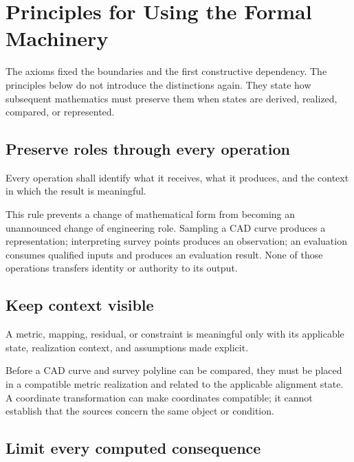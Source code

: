 
\chapter{Principles for Using the Formal Machinery}
\label{chap:architectural-principles}

The axioms fixed the boundaries and the first constructive dependency.
The principles below do not introduce the distinctions again. They state
how subsequent mathematics must preserve them when states are derived,
realized, compared, or represented.

\section{Preserve roles through every operation}

\begin{principle}
\label{princ:typed-dependency}
Every operation shall identify what it receives, what it produces, and
the context in which the result is meaningful.
\end{principle}

This rule prevents a change of mathematical form from becoming an
unannounced change of engineering role. Sampling a CAD curve produces a
representation; interpreting survey points produces an observation; an
evaluation consumes qualified inputs and produces an evaluation result.
None of those operations transfers identity or authority to its output.

\section{Keep context visible}

\begin{principle}
\label{princ:explicit-applicability}
A metric, mapping, residual, or constraint is meaningful only with its
applicable state, realization context, and assumptions made explicit.
\end{principle}

Before a CAD curve and survey polyline can be compared, they must be
placed in a compatible metric realization and related to the applicable
alignment state. A coordinate transformation can make coordinates
compatible; it cannot establish that the sources concern the same object
or condition.

\section{Limit every computed consequence}

